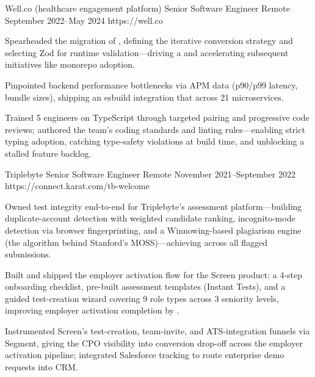 \begin{cventries}
\jobentry
  {Well.co (healthcare engagement platform)} %
  {Senior Software Engineer} %
  {Remote} %
  {September 2022--May 2024} %
  {https://well.co} %
  {
    \begin{cvitems}
      \item{Spearheaded the migration of , defining the iterative conversion strategy and selecting Zod for runtime validation---driving a  and accelerating subsequent initiatives like monorepo adoption.}
      \item{Pinpointed backend performance bottlenecks via APM data (p90/p99 latency, bundle sizes), shipping an esbuild integration that  across 21 microservices.}
      \item{Trained 5 engineers on TypeScript through targeted pairing and progressive code reviews; authored the team's coding standards and linting rules---enabling strict typing adoption, catching type-safety violations at build time, and unblocking a stalled feature backlog.}
    \end{cvitems}
  }

\jobentry
  {Triplebyte} %
  {Senior Software Engineer} %
  {Remote} %
  {November 2021--September 2022} %
  {https://connect.karat.com/tb-welcome} %
  {
    \begin{cvitems}
      \item{Owned test integrity end-to-end for Triplebyte's  assessment platform---building duplicate-account detection with weighted candidate ranking, incognito-mode detection via browser fingerprinting, and a Winnowing-based plagiarism engine (the algorithm behind Stanford's MOSS)---achieving  across all flagged submissions.}
      \item{Built and shipped the employer activation flow for the Screen product: a 4-step onboarding checklist, pre-built assessment templates (Instant Tests), and a guided test-creation wizard covering 9 role types across 3 seniority levels, improving employer activation completion by .}
      \item{Instrumented Screen's test-creation, team-invite, and ATS-integration funnels via Segment, giving the CPO visibility into conversion drop-off across the employer activation pipeline; integrated Salesforce tracking to route enterprise demo requests into CRM.}
    \end{cvitems}
  }


\end{cventries}
